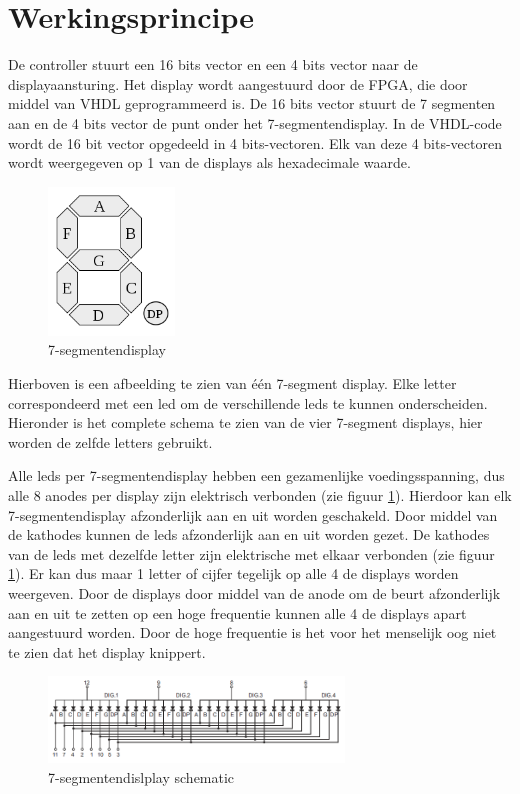 \documentclass{report}
\begin{document}
\newpage
\section{Werkingsprincipe}
De controller stuurt een 16 bits vector en een 4 bits vector naar de displayaansturing.
Het display wordt aangestuurd door de FPGA, die door middel van VHDL geprogrammeerd is.
De 16 bits vector stuurt de 7 segmenten aan en de 4 bits vector de punt onder het 7-segmentendisplay.
In de VHDL-code wordt de 16 bit vector opgedeeld in 4 bits-vectoren.
Elk van deze 4 bits-vectoren wordt weergegeven op 1 van de displays als hexadecimale waarde.
\begin{figure}[H]
\centering
\includegraphics[width=0.3\textwidth]{7_segment_display.png}

\caption{7-segmentendisplay}
\end{figure}
Hierboven is een afbeelding te zien van \'{e}\'{e}n 7-segment display.
Elke letter correspondeerd met een led om de verschillende leds te kunnen onderscheiden.
Hieronder is het complete schema te zien van de vier 7-segment displays, hier worden de zelfde letters gebruikt.

Alle leds per 7-segmentendisplay hebben een gezamenlijke voedingsspanning, dus alle 8 anodes per display zijn elektrisch verbonden (zie figuur \ref{fig:ssegschematic}).
Hierdoor kan elk 7-segmentendisplay afzonderlijk aan en uit worden geschakeld.
Door middel van de kathodes kunnen de leds afzonderlijk aan en uit worden gezet.
De kathodes van de leds met dezelfde letter zijn elektrische met elkaar verbonden (zie figuur \ref{fig:ssegschematic}).
Er kan dus maar 1 letter of cijfer tegelijk op alle 4 de displays worden weergeven.
Door de displays door middel van de anode om de beurt afzonderlijk aan en uit te zetten op een hoge frequentie kunnen alle 4 de displays apart aangestuurd worden.
Door de hoge frequentie is het voor het menselijk oog niet te zien dat het display knippert.
\begin{figure}[H]
\centering

\includegraphics[width=0.7\textwidth]{7_segment_display_schematic.png}

\caption{7-segmentendislplay schematic}
\label{fig:ssegschematic}
\end{figure}
\end{document}
